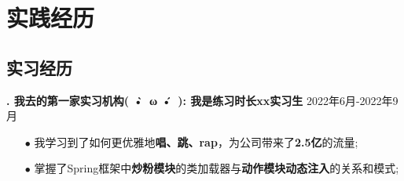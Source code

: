 \documentclass[10pt]{article}
\begin{document}
    \section{\makebox[\widthof{\faGears}][c]{\color{CQMU_Green}{\faLaptop}}\quad 实践经历}
    \vspace{0.5em}
    \subsection{\Large 实习经历}
    \vspace{0.5em}
    \textbf{\uppercase\expandafter{}. 我去的第一家实习机构( •̀\ ω •́\ ): 我是练习时长xx实习生
    }  \hfill 2022年6月-2022年9月
    \vspace{0.4em}
    \begin{itemize}[itemsep=1pt, leftmargin=2em]
        \item[\Large $\bullet$] \small 我学习到了如何更优雅地\textbf{唱、跳、rap}，为公司带来了\textbf{2.5亿}的流量;
        \item[\Large $\bullet$] \small 掌握了Spring框架中\textbf{炒粉模块}的类加载器与\textbf{动作模块动态注入}的关系和模式;
    \end{itemize}
\end{document}
